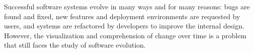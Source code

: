 \documentclass[times, 10pt,twocolumn]{article}
\newcommand{\igWh}[1]{\texttt{[image: \#1]}}
\newcommand{\yarn}{\emph{YARN\xspace}}
\newcommand{\YARN}{\yarn}
\newcommand{\postgresql}{\emph{PostgreSQL}\xspace}
\begin{document}











\newcommand{\abram}[1]{\emph{(***ABRAM***: #1)}}
\newcommand{\graphfigfile}[1]{presentation/graph#1}
\newcommand{\graphlabel}[1]{fig:graph#1}
\newcommand{\yarnshots}{6}
\newcommand{\graphfig}[1]{
\begin{figure}[!b]
  \centering
  \igWh{\graphfigfile{#1}}
  \caption{\postgresql \YARN Flipbook shot #1/\yarnshots}
  \label{\graphlabel{#1}}
\end{figure}
}




Successful software systems evolve in many ways and for many reasons:  bugs
are found and fixed, new features and deployment environments are requested
by users, and systems are refactored by developers to improve the internal
design.  However, the visualization and comprehension of change over time
is a problem that still faces the study of software evolution.  
\end{document}
